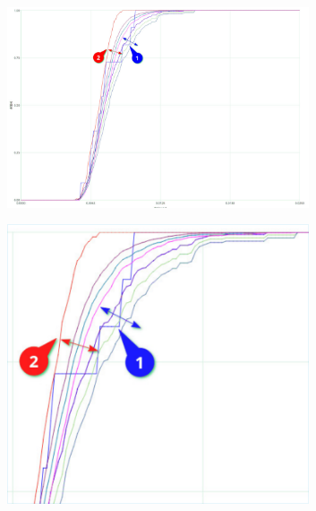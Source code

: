        \begin{figure}[H]
            \centering
            \begin{subfigure}{.5\textwidth}
                \centering
                \includegraphics[width=0.98\textwidth]{img/overload_2/150_probe2.pdf}
                \label{fig:ovuvv}
            \end{subfigure}%
            \begin{subfigure}{.5\textwidth}
                \centering
                \includegraphics[width =0.98\textwidth]{img/overload_2/150_probe2zoom_cropped.pdf}
                \label{fig:ovovv}
            \end{subfigure}

\end{figure}
